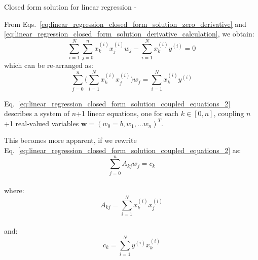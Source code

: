 \begin{frame}[t,allowframebreaks]{Closed form solution for linear regression -}
    \framebreak


    From Eqs.~\ref{eq:linear_regression_closed_form_solution_zero_derivative} and
    \ref{eq:linear_regression_closed_form_solution_derivative_calculation}, 
    we obtain:
    \begin{equation}
        \sum_{i=1}^{N} \sum_{j=0}^{n} x_k^{(i)} x_j^{(i)} w_j -
        \sum_{i=1}^{N} x_k^{(i)} y^{(i)} = 0
        \label{eq:linear_regression_closed_form_solution_coupled_equations_1}
    \end{equation}
    which can be re-arranged as:
    \begin{equation}
        \sum_{j=0}^{n} \Big(\sum_{i=1}^{N} x_k^{(i)} x_j^{(i)} \Big) w_j = 
        \sum_{i=1}^{N} x_k^{(i)} y^{(i)}  
        \label{eq:linear_regression_closed_form_solution_coupled_equations_2}
    \end{equation}

    Eq.~\ref{eq:linear_regression_closed_form_solution_coupled_equations_2} 
    describes a system of $n$+1 linear equations, one for each $k \in [0,n]$,
    coupling $n$+1 real-valued variables $\mathbf{w}=(w_0=b, w_1,...w_{n})^T$.

    \framebreak

    This becomes more apparent, if we rewrite 
    Eq.~\ref{eq:linear_regression_closed_form_solution_coupled_equations_2} as:
    \begin{equation}
        \sum_{j=0}^{n} A_{kj} w_j = c_k
        \label{eq:linear_regression_closed_form_solution_coupled_equations_3}
    \end{equation}\\
    \vspace{-0.1cm}
    where:\\
    \vspace{-0.5cm}
    \begin{equation}
        A_{kj} = \sum_{i=1}^{N}  x_k^{(i)} x_j^{(i)}
        \label{eq:linear_regression_closed_form_solution_coupled_equations_A}
    \end{equation}\\
    \vspace{-0.3cm}
    and:\\
    \vspace{-0.3cm}
    \begin{equation}
        c_{k} = \sum_{i=1}^{N} y^{(i)} x_k^{(i)}
        \label{eq:linear_regression_closed_form_solution_coupled_equations_c}
    \end{equation}


\end{frame}
